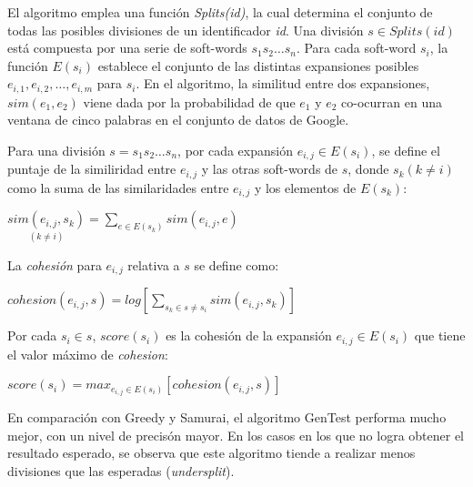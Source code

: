 El algoritmo emplea una función \textit{Splits(id)}, la cual determina el conjunto de todas las posibles divisiones de un identificador \textit{id}.
Una división $s \in Splits(id)$ está compuesta por una serie de soft-words $s_1 s_2 \dots s_n$.
Para cada soft-word $s_i$, la función $E(s_i)$ establece el conjunto de las distintas expansiones posibles $e_{i,1}, e_{i,2}, \dots, e_{i,m}$ para $s_i$.
En el algoritmo, la similitud entre dos expansiones, $sim(e_1, e_2)$ viene dada por la probabilidad de que $e_1$ y $e_2$ co-ocurran en una ventana de cinco palabras en el conjunto de datos de Google.

Para una división $s = s_1 s_2 \dots s_n$, por cada expansión $e_{i,j} \in E(s_i)$, se define el puntaje de la similiridad entre $e_{i,j}$ y las otras soft-words de $s$, donde $s_k (k \neq i)$ como la suma de las similaridades entre $e_{i,j}$ y los elementos de $E(s_k)$:

\begin{center}
  $\underset{(k \neq i)}{sim(e_{i,j}, s_k)} = \displaystyle\sum_{e \in E(s_k)} sim(e_{i,j}, e)$
\end{center}

La \textit{cohesión} para $e_{i,j}$ relativa a $s$ se define como:

\begin{center}
  $cohesion(e_{i,j}, s) = log \displaystyle [\sum_{s_k \in s \neq s_i} sim(e_{i,j}, s_k)]$
\end{center}

Por cada $s_i \in s$, $score(s_i)$ es la cohesión de la expansión $e_{i,j} \in E(s_i)$ que tiene el valor máximo de \textit{cohesion}:

\begin{center}
  $score(s_i) = max_{e_{i,j} \in E(s_i)} [cohesion(e_{i,j}, s)]$
\end{center}

En comparación con Greedy y Samurai, el algoritmo GenTest performa mucho mejor, con un nivel de precisón mayor.
En los casos en los que no logra obtener el resultado esperado, se observa que este algoritmo tiende a realizar menos divisiones que las esperadas (\textit{undersplit}).
